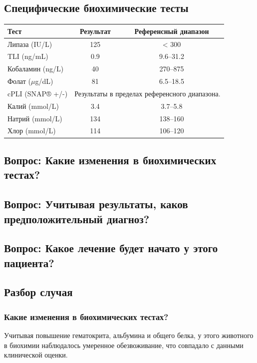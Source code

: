 \documentclass[a4paper,12pt]{book}
\begin{document}
\subsection*{Специфические биохимические тесты}
\begin{tabular}{lcc}
\toprule
Тест & Результат & Референсный диапазон \\
\midrule
Липаза (IU/L) & 125 & < 300 \\
TLI (ng/mL) & 0.9 & 9.6--31.2 \\
Кобаламин (ng/L) & 40 & 270--875 \\
Фолат ($\mu$g/dL) & 81 & 6.5--18.5 \\
cPLI (SNAP® +/-) & \multicolumn{2}{c}{Результаты в пределах референсного диапазона.} \\
Калий (mmol/L) & 3.4 & 3.7--5.8 \\
Натрий (mmol/L) & 134 & 138--160 \\
Хлор (mmol/L) & 114 & 106--120 \\
\bottomrule
\end{tabular}

\subsection*{Вопрос: Какие изменения в биохимических тестах?}
\subsection*{Вопрос: Учитывая результаты, каков предположительный диагноз?}
\subsection*{Вопрос: Какое лечение будет начато у этого пациента?}

\subsection*{Разбор случая}
\subsubsection*{Какие изменения в биохимических тестах?}
Учитывая повышение гематокрита, альбумина и общего белка, у этого животного в биохимии наблюдалось умеренное обезвоживание, что совпадало с данными клинической оценки.
\end{document}
